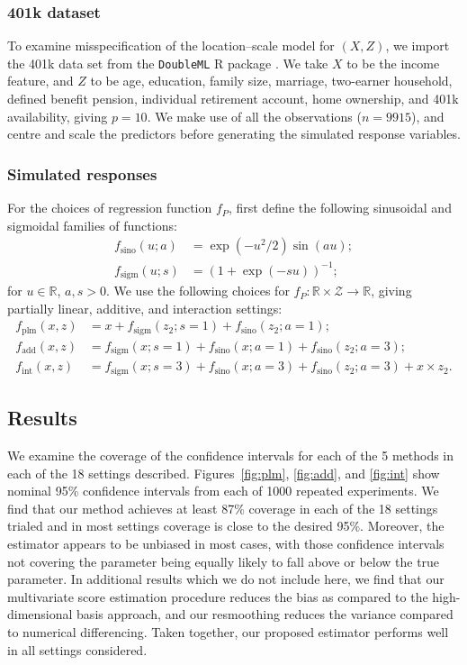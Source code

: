 \documentclass[aos]{imsart}
\newcommand{\R}{\mathbb{R}}
\begin{document}
	
	\subsubsection{401k dataset}
	\label{sect:401k}
	To examine misspecification of the location--scale model for $(X,Z)$, we import the 401k data set from the \texttt{DoubleML} R package \citep{DoubleML}. We take $X$ to be the income feature, and $Z$ to be age, education, family size, marriage, two-earner household, defined benefit pension, individual retirement account, home ownership, and 401k availability, giving $p=10$. We make use of all the observations ($n=9915$), and centre and scale the predictors before generating the simulated response variables.
	
	
	\subsubsection{Simulated responses}
	
	For the choices of regression function $f_P$, first define the following sinusoidal and sigmoidal families of functions:
	\begin{align*}
		f_{\text{sino}}(u; a) &= \exp(-u^2/2)\sin(au);\\
		f_{\text{sigm}}(u; s) &= (1+\exp(-su))^{-1};
	\end{align*} for $u\in \R$, $a, s>0$. We use the following choices for $f_P:\R\times\mathcal{Z}\to \R$, giving partially linear, additive, and interaction settings:
	\begin{align}
		f_{\text{plm}}(x,z)&=x + f_{\text{sigm}}(z_2; s=1) + f_{\text{sino}}(z_2; a=1) \label{eqn:plmsetting};\\
		f_{\text{add}}(x,z)&=f_{\text{sigm}}(x; s=1) + f_{\text{sino}}(x; a=1) + f_{\text{sino}}(z_2; a=3) \label{eqn:addsetting};\\
		f_{\text{int}}(x,z)&=f_{\text{sigm}}(x; s=3) + f_{\text{sino}}(x; a=3) + f_{\text{sino}}(z_2; a=3) + x \times z_2.\label{eqn:intsetting}
	\end{align}
	
	\subsection{Results}
	
	We examine the coverage of the confidence intervals for each of the 5 methods in each of the 18 settings described. Figures~\ref{fig:plm}, \ref{fig:add}, and \ref{fig:int} show nominal 95\% confidence intervals from each of 1000 repeated experiments. We find that our method achieves at least 87\% coverage in each of the 18 settings trialed and in most settings coverage is close to the desired 95\%. Moreover, the estimator appears to be unbiased in most cases, with those confidence intervals not covering the parameter being equally likely to fall above or below the true parameter. In additional results which we do not include here, we find that our multivariate score estimation procedure reduces the bias as compared to the high-dimensional basis approach, and our resmoothing reduces the variance compared to numerical differencing. Taken together, our proposed estimator performs well in all settings considered.
	
\end{document}
